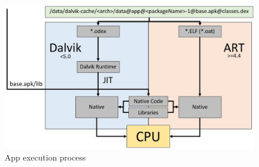 \begin{figure}[htb]
  \includegraphics[width=\textwidth]{figures/app_execution}
  \caption[App execution process]{App execution process}
  \label{fig:app_execution}
\end{figure}

